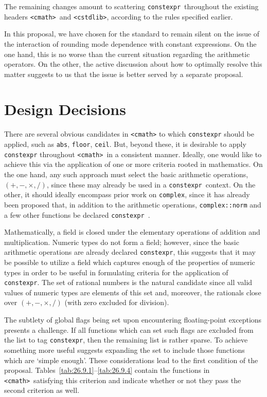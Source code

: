 \documentclass[prd,twocolumn,amsmath,amssymb,nofootinbib,eqsecnum]{revtex4-1}
\newcommand{\constexpr}{\code{constexpr}\xspace}
\newcommand{\code}[1]{{\tt #1}}
\newcommand{\header}[1]{{\tt <#1>}}
\newcommand{\cmath}{\header{cmath}}
\begin{document}
The remaining changes amount to scattering \constexpr\ throughout the existing headers \cmath\ and \header{cstdlib}, according to the rules specified earlier. 

In this proposal, we have chosen for the standard to remain silent on the issue of the interaction of rounding mode dependence with constant expressions. On the one hand, this is no worse than the current situation regarding the arithmetic operators. On the other, the active discussion about how to optimally resolve this matter suggests to us that the issue is better served by a separate proposal.

\section{Design Decisions}
\label{sec:dd}

There are several obvious candidates in \header{cmath} to which \constexpr should be applied, such as \code{abs}, \code{floor}, \code{ceil}.  But, beyond these, it is desirable to
apply \constexpr throughout \cmath\ in a consistent manner. Ideally, one would like to achieve this via the application of one or more criteria rooted in mathematics. On the one hand, any such approach must
select the
basic arithmetic operations, $(+,-,\times,/)$, since these may already be used in a 
\constexpr\ context. On the other,  it should ideally encompass prior work on \code{complex}, since it has already been proposed that, in addition to the arithmetic operations, \code{complex::norm} and a few other functions be declared \constexpr~\cite{AP-complex}. 

Mathematically, a field is closed under the elementary operations of addition
and multiplication.
Numeric types do not form a field; however, since the basic arithmetic
operations are already declared \constexpr, this suggests that it may be
possible to utilize a field which captures enough of the properties of numeric
types in order to be useful in formulating criteria for the application of
\constexpr. The set of rational numbers is the natural candidate since all valid
values of numeric types are elements of this set and, moreover, the rationals close over
$(+,-,\times,/)$ (with zero excluded for division).

The subtlety of global flags being set upon encountering floating-point
exceptions presents a challenge. If all functions which can set such flags are
excluded from the list to tag \constexpr, then the remaining list is rather
sparse. To achieve something more useful suggests expanding the set to include
those functions which are `simple enough'. These considerations lead to the
first condition of the proposal.
Tables~\ref{tab:26.9.1}--\ref{tab:26.9.4} contain the functions in \cmath\
satisfying this criterion and indicate whether or not they pass the second criterion as well. 
\end{document}
